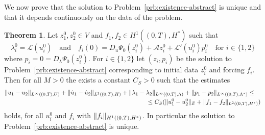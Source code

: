 \documentclass[a4paper,10pt,twoside]{amsbook}
\numberwithin{section}{chapter}
\numberwithin{equation}{chapter}
\theoremstyle{definition}
\newtheorem{thm}[prop]{Theorem}
\DeclarePairedDelimiter{\norm}{\lVert}{\rVert}
\begin{document}
We now prove that the solution to Problem~\ref{prb:existence-abstract} is unique and that it depends continuously on the data of the problem.
\begin{thm}
Let $z_1^0,z_2^0\in V$ and $f_1,f_2\in H^1((0,T),H^*)$ such that
\[
\lambda_i^0=\mathcal{L}(u_i^0)\quad\text{and}\quad f_i(0)=D_u\Psi_0(z_i^0)+\mathcal{A}z_i^0+\mathcal{L}'(u_i^0)p_i^0\quad\text{for $i\in\{1,2\}$}
\]
where $p_i=0=D_\lambda\Psi_0(z_i^0)$. For $i\in\{1,2\}$ let $(z_i,p_i)$ be the solution to Problem~\ref{prb:existence-abstract} corresponding to initial data $z_i^0$ and forcing $f_i$. Then for all $M>0$ the exists a constant $C_S>0$ such that the estimates
\[
\begin{multlined}
\norm{u_1-u_2}_{L^\infty((0,T),U)}+\norm{\dot u_1-\dot u_2}_{L^2((0,T),H)}+\norm{\lambda_1-\lambda_2}_{L^\infty((0,T),\Lambda)}+\norm{p_1-p_2}_{L^\infty((0,T),\Lambda^*)}\le\\
\le C_S(\norm{u_1^0-u_2^0}_Z+\norm{f_1-f_2}_{L^2((0,T),H^*)})
\end{multlined}
\]
holds, for all $u_i^0$ and $f_i$ with $\norm{f_i}_{H^1((0,T),H^*)}$. In particular the solution to Problem~\ref{prb:existence-abstract} is unique.
\end{thm}
\end{document}
